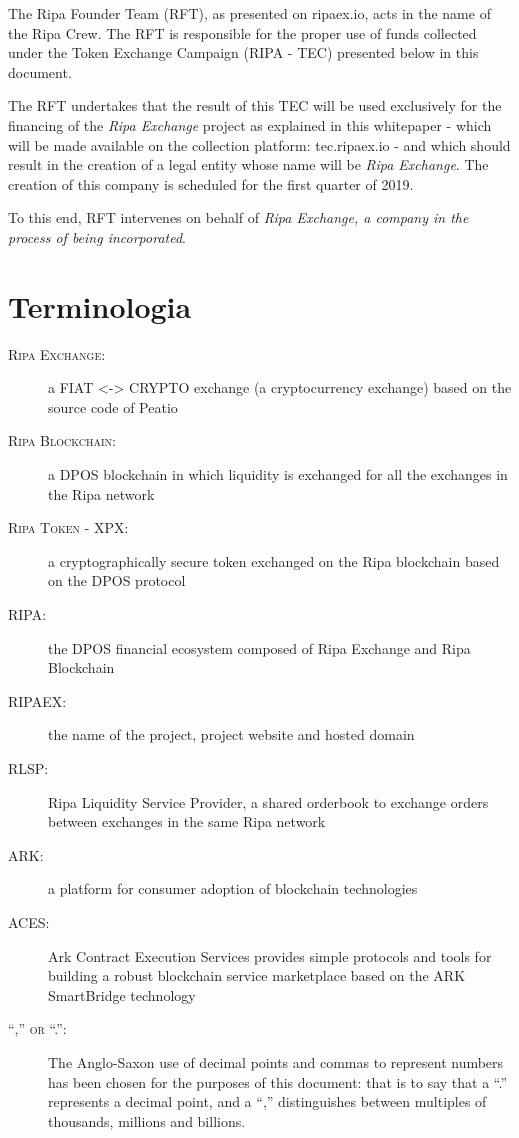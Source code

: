 \documentclass[11pt,fleqn,oneside]{book} %
\begin{document}
The Ripa Founder Team (RFT), as presented on ripaex.io, acts in the name of the Ripa Crew. The RFT is responsible for the proper use of 
funds collected under the Token Exchange Campaign (RIPA - TEC) presented below in this document.

The RFT undertakes that the result of this TEC will be used exclusively for the financing of the \emph{Ripa Exchange} project as explained in this 
whitepaper - which will be made available on the collection platform: tec.ripaex.io - and which should result in the creation of a 
legal entity whose name will be \emph{Ripa Exchange}. The creation of this company is scheduled for the first quarter of 2019.

To this end, RFT intervenes on behalf of \emph{Ripa Exchange, a company in the process of being incorporated}.





\section{Terminologia}
\begin{description}
	\item[\textsc{Ripa Exchange:}] a FIAT <-> CRYPTO exchange (a cryptocurrency exchange) based on the source code
	of Peatio \cite{peatio}
	\item[\textsc{Ripa Blockchain:}] a DPOS blockchain in which liquidity is exchanged for all the exchanges in the Ripa network
	\item[\textsc{Ripa Token - XPX:}] a cryptographically secure token exchanged on the Ripa blockchain based on the DPOS protocol
	\item[\textsc{RIPA:}] the DPOS financial ecosystem composed of Ripa Exchange and Ripa Blockchain
	\item[\textsc{RIPAEX:}] the name of the project, project website and hosted domain
    \item[\textsc{RLSP:}] Ripa Liquidity Service Provider, a shared orderbook to exchange orders between exchanges in the same Ripa network
	\item[\textsc{ARK:}] a platform for consumer adoption of blockchain technologies \cite{ark}
	\item[\textsc{ACES:}] Ark Contract Execution Services \cite{aces} provides simple protocols and tools for building a robust 
	blockchain service marketplace based on the ARK SmartBridge technology
    \item[\textsc{“,” or “.”:}] The Anglo-Saxon use of decimal points and commas to represent numbers has
been chosen for the purposes of this document: that is to say that a “.” represents a decimal point, and a “,”
distinguishes between multiples of thousands, millions and billions.
    \end{description}
\end{document}
